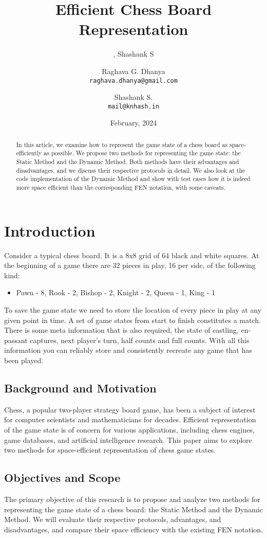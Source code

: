 \documentclass{article}
\title{Efficient Chess Board Representation}
\author{, Shashank S}
\author{
  Raghava G. Dhanya\\
  \texttt{raghava.dhanya@gmail.com}
  \and
  Shashank S.\\
  \texttt{mail@knhash.in}
}
\date{February, 2024}
\begin{document}
\maketitle

\begin{abstract}
    In this article, we examine how to represent the game state of a chess board as space-efficiently as possible. We propose two methods for representing the game state: the Static Method and the Dynamic Method. Both methods have their advantages and disadvantages, and we discuss their respective protocols in detail. We also look at the code implementation of the Dynamic Method and show with test cases how it is indeed more space efficient than the corresponding FEN notation, with some caveats.
\end{abstract}
\newpage

\section{Introduction}
Consider a typical chess board. It is a 8x8 grid of 64 black and white squares.
At the beginning of a game there are 32 pieces in play, 16 per side, of the following kind:
\begin{itemize}
  \item Pawn - 8, Rook - 2, Bishop - 2, Knight - 2, Queen - 1, King - 1
\end{itemize}

To save the game state we need to store the location of every piece in play at any given point in time. A set of game states from start to finish constitutes a match. There is some meta information that is also required, the state of castling, en-passant captures, next player's turn, half counts and full counts. With all this information you can reliably store and consistently recreate any game that has been played.

\subsection{Background and Motivation}
Chess, a popular two-player strategy board game, has been a subject of interest for computer scientists and mathematicians for decades. Efficient representation of the game state is of concern for various applications, including chess engines, game databases, and artificial intelligence research. This paper aims to explore two methods for space-efficient representation of chess game states. 

\subsection{Objectives and Scope}
The primary objective of this research is to propose and analyze two methods for representing the game state of a chess board: the Static Method and the Dynamic Method. We will evaluate their respective protocols, advantages, and disadvantages, and compare their space efficiency with the existing FEN notation.
\end{document}
